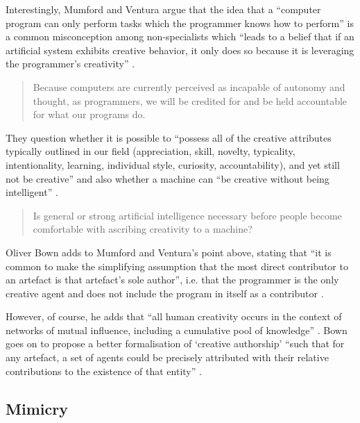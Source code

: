 \spirals

Interestingly, Mumford and Ventura argue that the idea that a ``computer program can only perform tasks which the programmer knows how to perform'' is a common misconception among non-specialists which ``leads to a belief that if an artificial system exhibits creative behavior, it only does so because it is leveraging the programmer's creativity'' \autocite*{Mumford2015}.

\begin{quotation}
  Because computers are currently perceived as incapable of autonomy and thought, as programmers, we will be credited for and be held accountable for what our programs do. 
\end{quotation}

They question whether it is possible to ``possess all of the creative attributes typically outlined in our field (appreciation, skill, novelty, typicality, intentionality, learning, individual style, curiosity, accountability), and yet still not be creative'' and also whether a machine can ``be creative without being intelligent'' \autocite{Mumford2015}.

\begin{quotation}
  Is general or strong artificial intelligence necessary before people become comfortable with ascribing creativity to a machine? 
\end{quotation}

Oliver Bown adds to Mumford and Ventura's point above, stating that ``it is common to make the simplifying assumption that the most direct contributor to an artefact is that artefact's sole author'', i.e. that the programmer is the only creative agent and does not include the program in itself as a contributor \autocite*{Bown2015}.

However, of course, he adds that ``all human creativity occurs in the context of networks of mutual influence, including a cumulative pool of knowledge'' \autocite{Bown2015}. Bown goes on to propose a better formalisation of `creative authorship' ``such that for any artefact, a set of agents could be precisely attributed with their relative contributions to the existence of that entity'' \autocite*{Bown2015}.


\subsection{Mimicry}
\label{s:mimicry}


